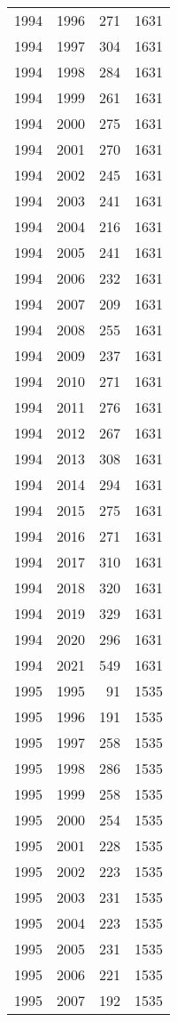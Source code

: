 \documentclass[
  10pt,
  letterpaper,
  DIV=11,
  numbers=noendperiod,
  twoside]{scrartcl}
\begin{document}
\begin{longtable}[]{@{}rrrr@{}}
1994 & 1996 & 271 & 1631 \\
1994 & 1997 & 304 & 1631 \\
1994 & 1998 & 284 & 1631 \\
1994 & 1999 & 261 & 1631 \\
1994 & 2000 & 275 & 1631 \\
1994 & 2001 & 270 & 1631 \\
1994 & 2002 & 245 & 1631 \\
1994 & 2003 & 241 & 1631 \\
1994 & 2004 & 216 & 1631 \\
1994 & 2005 & 241 & 1631 \\
1994 & 2006 & 232 & 1631 \\
1994 & 2007 & 209 & 1631 \\
1994 & 2008 & 255 & 1631 \\
1994 & 2009 & 237 & 1631 \\
1994 & 2010 & 271 & 1631 \\
1994 & 2011 & 276 & 1631 \\
1994 & 2012 & 267 & 1631 \\
1994 & 2013 & 308 & 1631 \\
1994 & 2014 & 294 & 1631 \\
1994 & 2015 & 275 & 1631 \\
1994 & 2016 & 271 & 1631 \\
1994 & 2017 & 310 & 1631 \\
1994 & 2018 & 320 & 1631 \\
1994 & 2019 & 329 & 1631 \\
1994 & 2020 & 296 & 1631 \\
1994 & 2021 & 549 & 1631 \\
1995 & 1995 & 91 & 1535 \\
1995 & 1996 & 191 & 1535 \\
1995 & 1997 & 258 & 1535 \\
1995 & 1998 & 286 & 1535 \\
1995 & 1999 & 258 & 1535 \\
1995 & 2000 & 254 & 1535 \\
1995 & 2001 & 228 & 1535 \\
1995 & 2002 & 223 & 1535 \\
1995 & 2003 & 231 & 1535 \\
1995 & 2004 & 223 & 1535 \\
1995 & 2005 & 231 & 1535 \\
1995 & 2006 & 221 & 1535 \\
1995 & 2007 & 192 & 1535 \\

\end{longtable}
\end{document}
